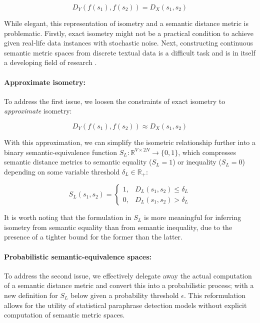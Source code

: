 \documentclass[11pt,a4paper]{article}
\begin{document}
\begin{equation}  
  \label{exact_isometry_eqn}
  D_Y(f(s_1),f(s_2)) = D_X(s_1,s_2)
\end{equation}

While elegant, this representation of isometry and a semantic distance metric is problematic. Firstly, exact isometry might not be a practical condition to achieve given real-life data instances with stochastic noise. Next, constructing continuous semantic metric spaces from discrete textual data is a difficult task and is in itself a developing field of research \cite{cer2017semeval}.

\paragraph{Approximate isometry:} To address the first issue, we loosen the constraints of exact isometry to \textit{approximate} isometry:

\begin{equation} 
  \label{approx_isometry_eqn}
  D_Y(f(s_1),f(s_2)) \approx D_X(s_1,s_2) 
\end{equation}

With this approximation, we can simplify the isometric relationship further into a binary semantic-equivalence function $S_L: \mathbb{R}^{V \times 2N} \to \{0,1\}$, which compresses semantic distance metrics to semantic equality ($S_L=1$) or inequality ($S_L=0$) depending on some variable threshold $\delta_L \in \mathbb{R}_+$:

\begin{equation}
  \label{bounded_isometry_eqn}
  S_L(s_1,s_2) =
  \begin{cases}
    1, &D_L(s_1,s_2) \leq \delta_L \\
    0, &D_L(s_1,s_2) > \delta_L
  \end{cases}
\end{equation}

It is worth noting that the formulation in $S_L$ is more meaningful for inferring isometry from semantic equality than from semantic inequality, due to the presence of a tighter bound for the former than the latter.

\paragraph{Probabilistic semantic-equivalence spaces:} To address the second issue, we effectively delegate away the actual computation of a semantic distance metric and convert this into a probabilistic process; with a new definition for $S_L$ below given a probability threshold $\epsilon$. This reformulation allows for the utility of statistical paraphrase detection models without explicit computation of semantic metric spaces. 
\end{document}

